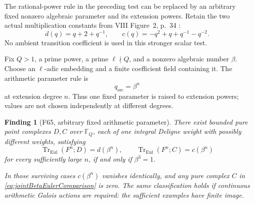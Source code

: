 \documentclass[11pt,a4paper]{article}
\newcommand{\fid}[1]{\textsf{#1}}\newcommand{\gate}[1]{\textsf{#1}}
\theoremstyle{named}\newtheorem{finding}{Finding}[section]
\theoremstyle{definition}\newtheorem{definition}[finding]{Definition}
\theoremstyle{remark}\newtheorem{remark}[finding]{Remark}
\begin{document}
The rational-power rule in the preceding test can be
replaced by an arbitrary fixed nonzero algebraic
parameter and its extension powers. Retain the two
actual multiplication constants from VIII Figure~2,
p.~34 \cite{VIII}:
\[
 d(q)=q+2+q^{-1},\qquad
 c(q)=-q^2+q+q^{-1}-q^{-2}.
\]
No ambient transition coefficient is used in this
stronger scalar test.

Fix \(Q>1\), a prime power, a prime \(\ell\nmid Q\),
and a nonzero algebraic number \(\beta\).
Choose an \(\ell\)-adic embedding and a finite coefficient
field containing it. The arithmetic parameter rule is
\[
                              q_{\mathrm{src}}=\beta^n
\]
at extension degree \(n\). Thus one fixed parameter is
raised to extension powers; values are not chosen
independently at different degrees.

\begin{finding}[\fid{F65}, arbitrary fixed arithmetic parameter]
\label{f:jointArbitraryArithmeticParameter}
There exist bounded pure point complexes \(D,C\) over
\(\mathbb F_Q\), each of one integral Deligne weight
with possibly different weights, satisfying
\begin{equation}\label{eq:jointBetaEulerComparison}
 \operatorname{Tr}_{\mathrm{Eul}}(F^n;D)=d(\beta^n),
 \qquad
 \operatorname{Tr}_{\mathrm{Eul}}(F^n;C)=c(\beta^n)
\end{equation}
for every sufficiently large \(n\), if and only if
\(\beta^3=1\).

In those surviving cases \(c(\beta^n)\) vanishes
identically, and any pure complex \(C\) in
\eqref{eq:jointBetaEulerComparison} is zero.
The same classification holds if continuous arithmetic
Galois actions are required: the sufficient examples
have finite image.
\end{finding}
\end{document}
